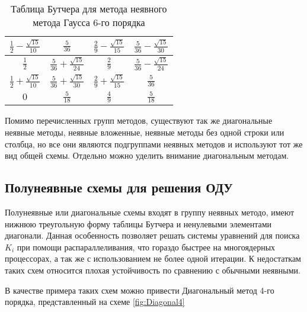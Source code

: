 \begin{table}    
    \caption{Таблица Бутчера для метода неявного метода Гаусса 6-го порядка}
    \begin{tabular}{|c|c|c|c|}
    \hline
    $\frac{1}{2} - \frac{\sqrt{15}}{10}$ & $\frac{5}{36}$ & $\frac{2}{9} - \frac{\sqrt{15}}{15}$ & $\frac{5}{36} - \frac{\sqrt{15}}{30}$\\
    \hline
    $\frac{1}{2}$ & $\frac{5}{36} + \frac{\sqrt{15}}{24}$ & $\frac{2}{9}$ & $\frac{5}{36} - \frac{\sqrt{15}}{24}$\\
    \hline
    $\frac{1}{2} + \frac{\sqrt{15}}{10}$ & $\frac{5}{36} + \frac{\sqrt{15}}{30}$ & $\frac{2}{9} + \frac{\sqrt{15}}{15}$ & $\frac{5}{36}$\\
    \hline
    $0$ & \cellcolor{lightgray} $\frac{5}{18}$ & \cellcolor{lightgray} $\frac{4}{9}$ & \cellcolor{lightgray} $\frac{5}{18}$\\
    \hline
    \end{tabular}
    \label{tab:Gauss6}
\end{table}

Помимо перечисленных групп методов, существуют так же диагональные неявные методы, неявные вложенные, неявные методы без одной строки
или столбца, но все они являются подгруппами неявных методов и используют тот же вид общей схемы. Отдельно можно уделить внимание
диагональным методам.

\subsection{Полунеявные схемы для решения ОДУ}

Полунеявные или диагональные схемы входят в группу неявных методо, имеют нижнюю треугольную форму таблицы Бутчера и ненулевыми
элементами диагонали. Данная особенность позволяет решать системы уравнений для поиска $K_i$ при помощи распараллеливания, что гораздо
быстрее на многоядерных процессорах, а так же с использованием не более одной итерации. К недостаткам таких схем относится плохая
устойчивость по сравнению с обычными неявными.

В качестве примера таких схем можно привести Диагональный метод 4-го порядка, представленный на схеме \ref{fig:Diagonal4}


